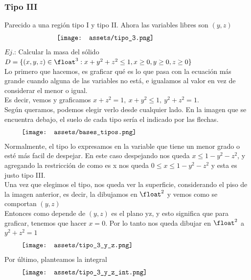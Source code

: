 \documentclass[10pt,a4paper]{article}
\begin{document}
\subsubsection*{Tipo III}
Parecido a una región tipo I y tipo II. Ahora las variables libres son $(y, z)$
\[\begin{minipage}[b]{0.6\textwidth}
    \texttt{[image: assets/tipo\_3.png]}
\end{minipage}\]
$Ej.$: Calcular la masa del sólido $D = \{(x,y,z) \in \float^{3}: x+y^{2}+z^{2} \le 1, x \ge 0, y \ge 0, z \ge 0\}$ \\
Lo primero que hacemos, es graficar qué es lo que pasa con la ecuación más grande cuando alguna de las variables no está, e igualamos al valor en vez de considerar el menor o igual. \\
Es decir, vemos y graficamos $x+z^{2} = 1,\ x+y^{2} \le 1, \ y^{2} + z^{2} = 1$. \\
Según queramos, podemos elegir verlo desde cualquier lado. En la imagen que se encuentra debajo, el suelo de cada tipo sería el indicado por las flechas. 
\[\begin{minipage}[b]{0.9\textwidth}
    \texttt{[image: assets/bases\_tipos.png]}
\end{minipage}\]
Normalmente, el tipo lo expresamos en la variable que tiene un menor grado o esté más facil de despejar. En este caso despejando nos queda $x \le 1-y^{2}-z^{2}$, y agregando la restricción de como es x nos queda $ 0 \le x \le 1-y^{2}-z^{2}$ y esta es justo tipo III. \\
Una vez que elegimos el tipo, nos queda ver la superficie, considerando el piso de la imagen anterior, es decir, la dibujamos en $\float^{2}$ y vemos como se comportan $(y,z)$ \\
Entonces como depende de $(y,z)$ es el plano yz, y esto significa que para graficar, tenemos que hacer $x = 0$. Por lo tanto nos queda dibujar en $\float^{2}$ a $y^{2} + z^{2} = 1$
\[\begin{minipage}[b]{0.9\textwidth}
    \texttt{[image: assets/tipo\_3\_y\_z.png]}
\end{minipage}\]
Por último, planteamos la integral
\[\begin{minipage}[b]{0.9\textwidth}
    \texttt{[image: assets/tipo\_3\_y\_z\_int.png]}
\end{minipage}\]
\end{document}
